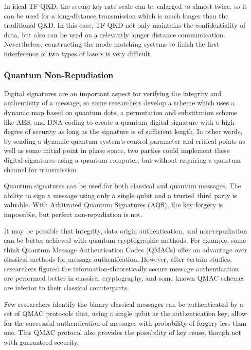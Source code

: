 \documentclass[sigconf]{acmart}
\begin{document}
In ideal TF-QKD, the secure key rate scale can be enlarged to almost twice, so it can be used for a long-distance transmission which is much longer than the traditional QKD. In this case, TF-QKD not only maintains the confidentiality of data, but also can be used on a relevantly longer distance communication. Nevertheless, constructing the mode matching systems to finish the first interference of two types of lasers is very difficult\cite{park_research_2020}.

\subsubsection{Quantum Non-Repudiation}
Digital signatures are an important aspect for verifying the integrity and authenticity of a message, so some researchers develop a scheme which uses a dynamic map based on quantum dots, a permutation and substitution scheme like AES, and DNA coding to create a quantum digital signature with a high degree of security as long as the signature is of sufficient length. In other words, by sending a dynamic quantum system's control parameter and critical points as well as some initial point in phase space, two parties could implement these digital signatures using a quantum computer, but without requiring a quantum channel for transmission\cite{hematpour_presence_2020}.

Quantum signatures can be used for both classical and quantum messages. The ability to sign a message using only a single qubit and a trusted third party is valuable. With Arbitrated Quantum Signatures (AQS), the key forgery is impossible, but perfect non-repudiation is not\cite{kang_quantum_2015}.

It may be possible that integrity, data origin authentication, and non-repudiation can be better achieved with quantum cryptographic methods. For example, some think Quantum Message Authentication Codes (QMACs) offer an advantage over classical methods for message authentication. However, after certain studies, researchers figured the information-theoretically secure message authentication are performed better in classical cryptography, and some known QMAC schemes are inferior to their classical counterparts\cite{nikolopoulos_information-theoretically_2020}.

Few researchers identify the binary classical messages can be authenticated by a set of QMAC protocols that, using a single qubit as the authentication key, allow for the successful authentication of messages with probability of forgery less than one. This QMAC protocol also provides the possibility of key reuse, though not with guaranteed security\cite{curty_quantum_2001}.
\end{document}

